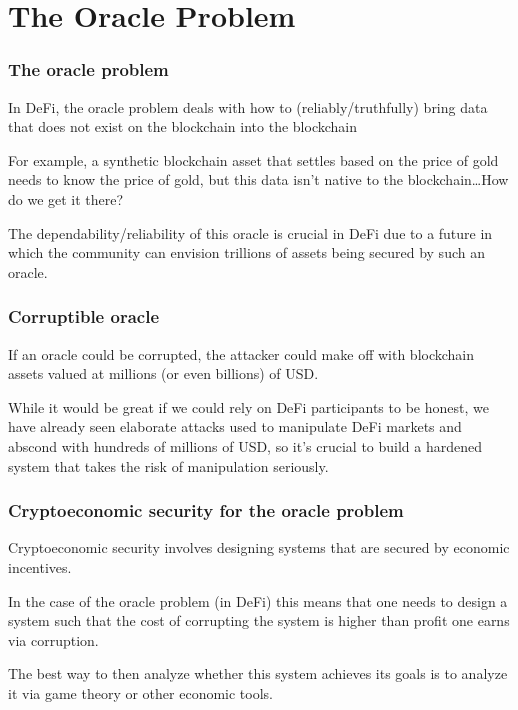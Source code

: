 \documentclass[10pt]{beamer}
\begin{document}
\section{The Oracle Problem}

  \begin{frame} \frametitle{The oracle problem}
    In DeFi, the oracle problem deals with how to (reliably/truthfully) bring data that does not
    exist on the blockchain into the blockchain

    \vspace{0.5cm}

    For example, a synthetic blockchain asset that settles based on the price of gold needs to know
    the price of gold, but this data isn't native to the blockchain\dots How do we get it there?

    \vspace{0.5cm}

    The dependability/reliability of this oracle is crucial in DeFi due to a future in which the
    community can envision trillions of assets being secured by such an oracle.
  \end{frame}

  \begin{frame} \frametitle{Corruptible oracle}
    If an oracle could be corrupted, the attacker could make off with blockchain assets valued at
    millions (or even billions) of USD.

    \vspace{0.5cm}

    While it would be great if we could rely on DeFi participants to be honest, we have already seen
    elaborate attacks used to manipulate DeFi markets and abscond with hundreds of millions of USD,
    so it's crucial to build a hardened system that takes the risk of manipulation seriously.

  \end{frame}

  \begin{frame} \frametitle{Cryptoeconomic security for the oracle problem}
    Cryptoeconomic security involves designing systems that are secured by economic incentives.

    \vspace{0.25cm}

    In the case of the oracle problem (in DeFi) this means that one needs to design a system such
    that the cost of corrupting the system is higher than profit one earns via corruption.

    \vspace{0.25cm}

    The best way to then analyze whether this system achieves its goals is to analyze it via game
    theory or other economic tools.
  \end{frame}
\end{document}
